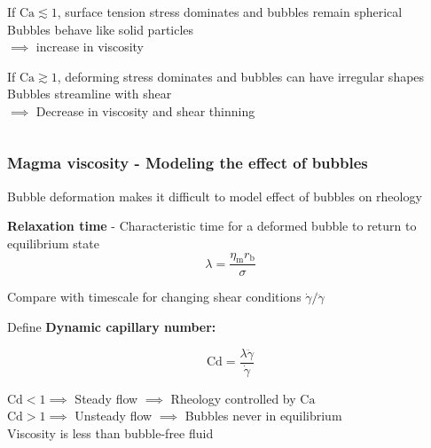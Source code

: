 \documentclass{beamer}
\begin{document}
\begin{frame}
\begin{columns}[t]
\begin{column}{0.5\textwidth}
      \vspace{0.5cm}
      
      If $\text{Ca} \lesssim 1$, surface tension stress dominates and bubbles remain spherical \\
      \hspace*{0.5cm} Bubbles behave like solid particles \\
      \hspace*{1cm} $\implies$ increase in viscosity \\

      \vspace{0.5cm}
      
      If $\text{Ca} \gtrsim 1$, deforming stress dominates and bubbles can have irregular shapes \\
      \hspace*{0.5cm} Bubbles streamline with shear \\
      \hspace*{1cm} $\implies$ Decrease in viscosity and
      \hspace*{1.85cm} shear thinning \\

    \end{column}
    
  \end{columns}

\end{frame}
\begin{frame}
  \frametitle{Magma viscosity - Modeling the effect of bubbles}

  Bubble deformation makes it difficult to model effect of bubbles on rheology \\

  \vspace{0.5cm}
  
  \textbf{Relaxation time} - Characteristic time for a deformed bubble to return to equilibrium state \\

  $$ \lambda = \frac{\eta_{\text{m}} r_{\text{b}}}{\sigma} $$

  Compare with timescale for changing shear conditions $\dot{\gamma}/\ddot{\gamma}$

  \vspace{0.5cm}
  
  Define \textbf{Dynamic capillary number:}

  $$ \text{Cd} = \frac{\lambda \ddot{\gamma}}{\dot{\gamma}} $$

  $\text{Cd} < 1 \implies$ Steady flow \hspace{0.25cm} $\implies$ Rheology controlled by $\text{Ca}$ \\

  $\text{Cd} > 1 \implies$ Unsteady flow $\implies$ Bubbles never in equilibrium \\

  \hspace{5.5cm} Viscosity is less than bubble-free fluid \\
  
\end{frame}
\end{document}
